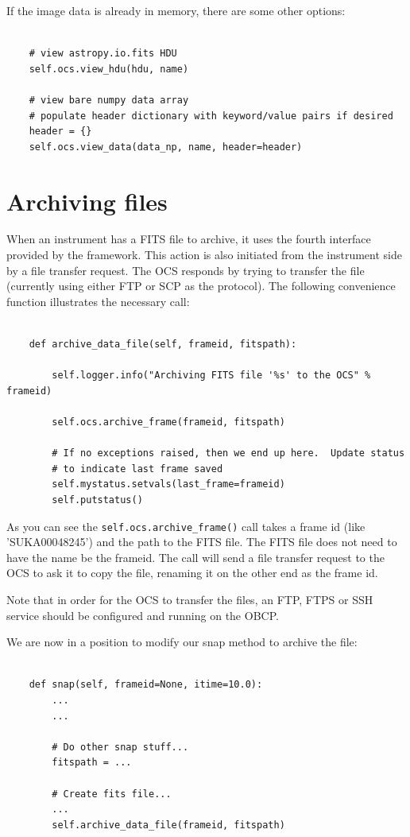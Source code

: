 \documentclass[11pt]{report}
\begin{document}
If the image data is already in memory, there are some other options:
\begin{verbatim}

    # view astropy.io.fits HDU
    self.ocs.view_hdu(hdu, name)

    # view bare numpy data array 
    # populate header dictionary with keyword/value pairs if desired
    header = {}
    self.ocs.view_data(data_np, name, header=header)

\end{verbatim}

\section{Archiving files}
When an instrument has a FITS file to archive, it uses the fourth
interface provided by the framework. This action is also initiated from
the instrument side by a file transfer request. The OCS responds by
trying to transfer the file (currently using either FTP or SCP as the
protocol).
The following convenience function illustrates the necessary call: 
\begin{verbatim}

    def archive_data_file(self, frameid, fitspath):

        self.logger.info("Archiving FITS file '%s' to the OCS" % frameid)

        self.ocs.archive_frame(frameid, fitspath)

        # If no exceptions raised, then we end up here.  Update status
        # to indicate last frame saved
        self.mystatus.setvals(last_frame=frameid)
        self.putstatus()

\end{verbatim}
As you can see the {\tt self.ocs.archive\_frame()} call takes a frame id (like
'SUKA00048245') and the path to the FITS file. The FITS file does not
need to have the name be the frameid. The call will send a file transfer
request to the OCS to ask it to copy the file, renaming it on the other
end as the frame id. 

Note that in order for the OCS to transfer the files, an FTP, FTPS or
SSH service should be configured and running on the OBCP.   

We are now in a position to modify our snap method to archive the file:
\begin{verbatim}

    def snap(self, frameid=None, itime=10.0):
        ...
        ...

        # Do other snap stuff...
        fitspath = ...

        # Create fits file...
        ...
        self.archive_data_file(frameid, fitspath)

\end{verbatim}
\end{document}
